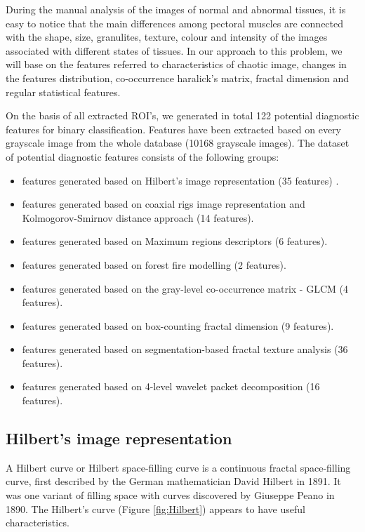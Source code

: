 \documentclass[review,12pt]{elsarticle}
\begin{document}
{During the manual analysis of the images of normal and abnormal tissues, it is easy to notice that the main differences among pectoral muscles are connected with the shape, size, granulites, texture, colour and intensity of the images associated with different states of tissues. In our approach to this problem, we will base on the features referred to characteristics of chaotic image, changes in the features distribution, co-occurrence haralick's matrix, fractal dimension and regular statistical features.

On the basis of all extracted ROI’s, we generated in total 122 potential diagnostic features for binary classification. Features have been extracted based on every grayscale image from the whole database (10168 grayscale images). The dataset of potential diagnostic features consists of the following groups:

\begin{itemize}
\item features generated based on Hilbert’s image representation (35 features) .
\item features generated based on coaxial rigs image representation and Kolmogorov-Smirnov distance approach (14 features).
\item features generated based on Maximum regions descriptors (6 features).
\item features generated based on forest fire modelling (2 features).
\item features generated based on the gray-level co-occurrence matrix - GLCM (4 features).
\item features generated based on box-counting fractal dimension (9 features).
\item features generated based on segmentation-based fractal texture analysis (36 features).
\item features generated based on 4-level wavelet packet decomposition (16 features).
\end{itemize}

\subsection{Hilbert’s image representation}\label{R3.1}

A Hilbert curve or  Hilbert space-filling curve is a continuous fractal space-filling
curve, first described by the German mathematician David Hilbert in 1891. It was one variant of  filling space  with curves discovered by Giuseppe Peano in 1890. The Hilbert's curve (Figure \ref{fig:Hilbert}) appears to have useful characteristics.

}
\end{document}

